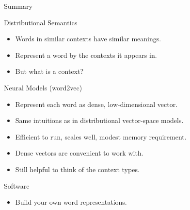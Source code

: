 \documentclass[compress]{beamer}
\begin{document}
\begin{frame}{Summary}
    \begin{block}{Distributional Semantics}
        \begin{itemize}
            \item Words in similar contexts have similar meanings.
            \item Represent a word by the contexts it appears in.
            \item But what is a context?
        \end{itemize}
    \end{block}
    \begin{block}{Neural Models (word2vec)}
        \begin{itemize}
            \item Represent each word as dense, low-dimensional vector.
            \item Same intuitions as in distributional vector-space models.
            \item Efficient to run, scales well, modest memory requirement.
            \item Dense vectors are convenient to work with.
            \item Still helpful to think of the context types.
        \end{itemize}
    \end{block}
    \vspace{-5pt}
    \begin{block}{Software}
        \begin{itemize}
        \item Build your own word representations.
        \end{itemize}
    \end{block}
\end{frame}
\end{document}
